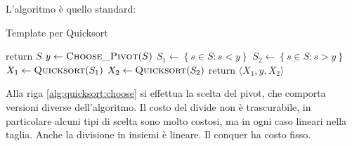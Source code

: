 L'algoritmo è quello standard:
\begin{algorithm}[H]
\caption{Template per Quicksort}\label{alg:quicksort}
\begin{algorithmic}[1]
            \State return $S$
        \EndIf
        \State $y \gets 
            \Call{Choose\_Pivot}{S}
        $
        \label{alg:quicksort:choose}
        \State $S_1 \gets \left\{ 
            s \in S : s < y
        \right\}
        $
        \State $S_2 \gets \left\{ 
            s \in S : s > y
        \right\}
        $
        \State $X_1 \gets 
            \Call{Quicksort}{S_1}
        $
        \State $X_2 \gets 
            \Call{Quicksort}{S_2}
        $
        \State return $\langle X_1, y, X_2 \rangle$
    \EndProcedure
\end{algorithmic}
\end{algorithm}
\noindent
Alla riga \ref{alg:quicksort:choose} si effettua la scelta del pivot, che comporta versioni diverse dell'algoritmo.
Il costo del divide non è trascurabile, in particolare alcuni tipi di scelta sono molto costosi, ma in ogni caso lineari nella taglia. Anche la divisione in insiemi è lineare. Il conquer ha costo fisso.

